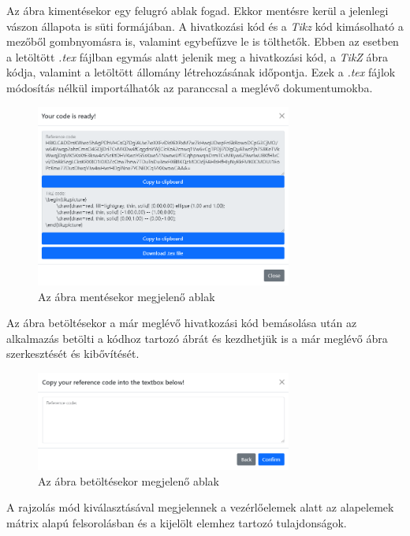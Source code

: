 Az ábra kimentésekor egy felugró ablak fogad. Ekkor mentésre kerül a jelenlegi vászon állapota is süti formájában. A hivatkozási kód és a \textit{Tikz} kód kimásolható a mezőből gombnyomásra is, valamint egybefűzve le is tölthetők. Ebben az esetben a letöltött \textit{.tex} fájlban egymás alatt jelenik meg a hivatkozási kód, a \textit{TikZ} ábra kódja, valamint a letöltött állomány létrehozásának időpontja. Ezek a \textit{.tex} fájlok módosítás nélkül importálhatók az \lstinline[style=latex]{} paranccsal a meglévő dokumentumokba. 

\begin{figure}[!h]
	\label{fig:load}
	\centering
	\includegraphics[width=0.75\textwidth]{images/save_modal.png}
	\caption{Az ábra mentésekor megjelenő ablak}
\end{figure}

Az ábra betöltésekor a már meglévő hivatkozási kód bemásolása után az alkalmazás betölti a kódhoz tartozó ábrát és kezdhetjük is a már meglévő ábra szerkesztését és kibővítését.

\begin{figure}[!h]
	\label{fig:save}
	\centering
	\includegraphics[width=0.75\textwidth]{images/load_modal.png}
	\caption{Az ábra betöltésekor megjelenő ablak}
\end{figure}


A rajzolás mód kiválasztásával megjelennek a vezérlőelemek alatt az alapelemek mátrix alapú felsorolásban és a kijelölt elemhez tartozó tulajdonságok.

